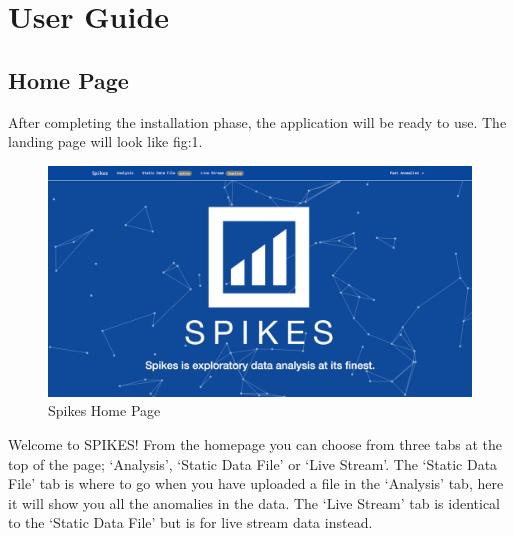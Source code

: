 \documentclass[12pt]{article}
\begin{document}
\section{User Guide}
  \subsection{Home Page}
  After completing the installation phase, the application will be ready to use. The landing page will look like
  fig:1.
  \begin{figure}[H]
  \centering
  \includegraphics[width=120mm]{home.png}
  \caption{Spikes Home Page}
  \end{figure}
  Welcome to SPIKES! From the homepage you can choose from three tabs at the top of the page; ‘Analysis’, ‘Static Data File’ or ‘Live Stream’.
  The ‘Static Data File’ tab is where to go when you have uploaded a file in the ‘Analysis’ tab, here it will show you all the anomalies in the data.
  The ‘Live Stream’ tab is identical to the ‘Static Data File’ but is for live stream data instead.
\end{document}
